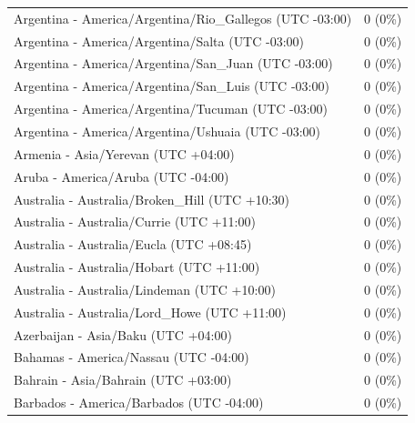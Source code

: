 \documentclass[
  english,
  man]{apa6}
\begin{document}
\begin{appendix}
\begin{table}
{\begin{tabular}[t]{ll}
\addlinespace
\hspace{1em}Argentina - America/Argentina/Rio\_Gallegos (UTC -03:00) & 0 (0\%)\\
\hspace{1em}Argentina - America/Argentina/Salta (UTC -03:00) & 0 (0\%)\\
\hspace{1em}Argentina - America/Argentina/San\_Juan (UTC -03:00) & 0 (0\%)\\
\hspace{1em}Argentina - America/Argentina/San\_Luis (UTC -03:00) & 0 (0\%)\\
\hspace{1em}Argentina - America/Argentina/Tucuman (UTC -03:00) & 0 (0\%)\\
\addlinespace
\hspace{1em}Argentina - America/Argentina/Ushuaia (UTC -03:00) & 0 (0\%)\\
\hspace{1em}Armenia - Asia/Yerevan (UTC +04:00) & 0 (0\%)\\
\hspace{1em}Aruba - America/Aruba (UTC -04:00) & 0 (0\%)\\
\hspace{1em}Australia - Australia/Broken\_Hill (UTC +10:30) & 0 (0\%)\\
\hspace{1em}Australia - Australia/Currie (UTC +11:00) & 0 (0\%)\\
\addlinespace
\hspace{1em}Australia - Australia/Eucla (UTC +08:45) & 0 (0\%)\\
\hspace{1em}Australia - Australia/Hobart (UTC +11:00) & 0 (0\%)\\
\hspace{1em}Australia - Australia/Lindeman (UTC +10:00) & 0 (0\%)\\
\hspace{1em}Australia - Australia/Lord\_Howe (UTC +11:00) & 0 (0\%)\\
\hspace{1em}Azerbaijan - Asia/Baku (UTC +04:00) & 0 (0\%)\\
\addlinespace
\hspace{1em}Bahamas - America/Nassau (UTC -04:00) & 0 (0\%)\\
\hspace{1em}Bahrain - Asia/Bahrain (UTC +03:00) & 0 (0\%)\\
\hspace{1em}Barbados - America/Barbados (UTC -04:00) & 0 (0\%)\\

\end{tabular}}
\end{table}
\end{appendix}
\end{document}
